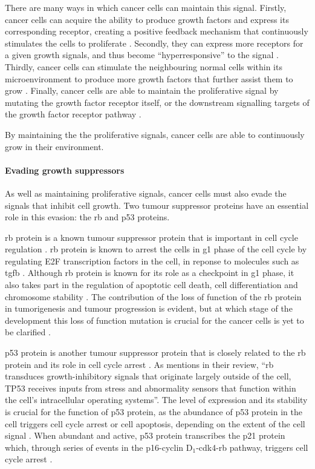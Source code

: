 There are many ways in which cancer cells can maintain this signal.
Firstly, cancer cells can acquire the ability to produce growth factors and express its corresponding receptor, creating a positive feedback mechanism that continuously stimulates the cells to proliferate \citep{Hanahan2000}.
Secondly, they can express more receptors for a given growth signals, and thus become ``hyperresponsive'' to the signal \citep{Hanahan2000,Hanahan2011}.
Thirdly, cancer cells can stimulate the neighbouring normal cells within its microenvironment to produce more growth factors that further assist them to grow \citep{Bhowmick2004, Liotta2001, Wiseman2002}.
Finally, cancer cells are able to maintain the proliferative signal by mutating the growth factor receptor itself, or the downstream signalling targets of the growth factor receptor pathway \citep{Fuqua1991,SuHuang1997,Satyamoorthy2003}.

By maintaining the the proliferative signals, cancer cells are able to continuously grow in their environment.

\paragraph{Evading growth suppressors}

\noindent
As well as maintaining proliferative signals, cancer cells must also evade the signals that inhibit cell growth.
Two tumour suppressor proteins have an essential role in this evasion: the \gls{rb} and p53 proteins.

\Gls{rb} protein is a known tumour suppressor protein that is important in cell cycle regulation \citep{Burkhart2008,Hanahan2011}.
\Gls{rb} protein is known to arrest the cells in \gls{g1} phase of the cell cycle by regulating E2F transcription factors in the cell, in reponse to molecules such as \gls{tgfb} \citep{Burkhart2008,Hanahan2000}.
Although \gls{rb} protein is known for its role as a checkpoint in \gls{g1} phase, it also takes part in the regulation of apoptotic cell death, cell differentiation and chromosome stability \citep{Burkhart2008}.
The contribution of the loss of function of the \gls{rb} protein in tumorigenesis and tumour progression is evident, but at which stage of the development this loss of function mutation is crucial for the cancer cells is yet to be clarified \citep{Burkhart2008}.

p53 protein is another tumour suppressor protein that is closely related to the \gls{rb} protein and its role in cell cycle arrest \citep{Hanahan2011,Levine1997}.
As \citet{Hanahan2011} mentions in their review, ``\gls{rb} transduces growth-inhibitory signals that originate largely outside of the cell, TP53 receives inputs from stress and abnormality sensors that function within the cell's intracellular operating systems''.
The level of expression and its stability is crucial for the function of p53 protein, as the abundance of p53 protein in the cell triggers cell cycle arrest or cell \gls{apoptosis}, depending on the extent of the cell signal \citep{Fridman2003,Hanahan2011,Levine1997}.
When abundant and active, p53 protein transcribes the p21 protein which, through series of events in the p16-cyclin D$_1$-cdk4-\gls{rb} pathway, triggers cell cycle arrest \citep{Levine1997}.

